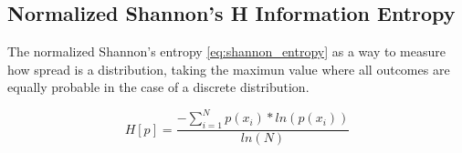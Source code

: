\subsection{Normalized Shannon's H Information Entropy}

\par The normalized Shannon's entropy \ref{eq:shannon_entropy} as a way to measure how spread is a distribution, taking the maximun value where all outcomes are equally probable in the case of a discrete distribution.

\begin{equation}
H[p] = \frac{- \sum_{i = 1}^{N} p(x_i) * ln(p(x_i))}{ln(N)}
\label{eq:shannon_entropy}
\end{equation}

